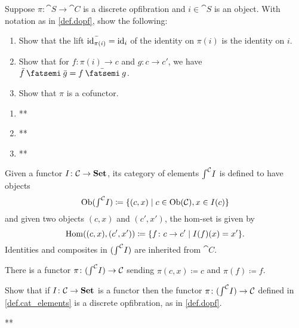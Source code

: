 \documentclass[Book-Poly]{subfiles}
\begin{document}
\begin{exercise}\label{exc.dopf_cof}
Suppose $\pi\colon\cat{S}\to\cat{C}$ is a discrete opfibration and $i\in\cat{S}
$ is an object. With notation as in \cref{def.dopf}, show the following:
\begin{enumerate}
	\item Show that the lift $\bar{\mathrm{id}_{\pi(i)}}=\mathrm{id}_i$ of the identity on $\pi(i)$ is the identity on $i$.
	\item Show that for $f\colon\pi(i)\to c$ and $g\colon c\to c'$, we have $\bar{f}\then\bar{g}=\bar{f\then g}$.
	\item Show that $\pi$ is a cofunctor.
\qedhere
\end{enumerate}
\begin{solution}
\begin{enumerate}
    \item **
    \item **
    \item **
\end{enumerate}
\end{solution}
\end{exercise}

\begin{definition}\label{def.cat_elements}
Given a functor $I\colon\mathcal{C}\to\mathbf{Set}$, its category of elements $\textstyle{\int}^{\mathcal{C}}I$ is defined to have objects
\[
\operatorname{Ob}(\textstyle{\int}^{\mathcal{C}}I)\coloneqq\{(c,x)\mid c\in\operatorname{Ob}(\mathcal{C}), x\in I(c)\}
\]
and given two objects $(c,x)$ and $(c',x')$, the hom-set is given by
\[
\operatorname{Hom}((c,x),(c',x'))\coloneqq\{f\colon c\to c'\mid I(f)(x)=x'\}.
\]
Identities and composites in $(\textstyle{\int}^{\mathcal{C}}I)$ are inherited from $\cat{C}$.

There is a functor $\pi\colon(\textstyle{\int}^{\mathcal{C}}I)\to\mathcal{C}$ sending $\pi(c,x)\coloneqq c$ and $\pi(f)\coloneqq f$.
\end{definition}

\begin{exercise}
Show that if $I\colon\mathcal{C}\to\mathbf{Set}$ is a functor then the functor $\pi\colon(\textstyle{\int}^{\mathcal{C}}I)\to\mathcal{C}$ defined in \cref{def.cat_elements} is a discrete opfibration, as in \cref{def.dopf}.
\begin{solution}
**
\end{solution}
\end{exercise}
\end{document}
